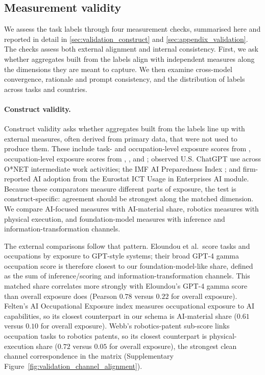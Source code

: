\documentclass[11pt]{article}
\begin{document}
\FloatBarrier
\subsection{Measurement validity}
\label{sec:data_external_benchmarks}
\label{sec:methods_validation}

We assess the task labels through four measurement checks, summarised here and reported in detail in \ref{sec:validation_construct} and \ref{sec:appendix_validation}. The checks assess both external alignment and internal consistency. First, we ask whether aggregates built from the labels align with independent measures along the dimensions they are meant to capture. We then examine cross-model convergence, rationale and prompt consistency, and the distribution of labels across tasks and countries.

\paragraph{Construct validity.} Construct validity asks whether aggregates built from the labels line up with external measures, often derived from primary data, that were not used to produce them. These include task- and occupation-level exposure scores from \citet{EloundouEtAl2024}, occupation-level exposure scores from \citet{frey2017future}, \citet{Webb2020}, and \citet{felten2021occupational}; observed U.S. ChatGPT use across O*NET intermediate work activities; the IMF AI Preparedness Index \citep{CazzanigaEtAl2024GenAI}; and firm-reported AI adoption from the Eurostat ICT Usage in Enterprises AI module. Because these comparators measure different parts of exposure, the test is construct-specific: agreement should be strongest along the matched dimension. We compare AI-focused measures with AI-material share, robotics measures with physical execution, and foundation-model measures with inference and information-transformation channels.

The external comparisons follow that pattern. Eloundou et al.\ score tasks and occupations by exposure to GPT-style systems; their broad GPT-4 gamma occupation score is therefore closest to our foundation-model-like share, defined as the sum of inference/scoring and information-transformation channels. This matched share correlates more strongly with Eloundou's GPT-4 gamma score than overall exposure does (Pearson $0.78$ versus $0.22$ for overall exposure). Felten's AI Occupational Exposure index measures occupational exposure to AI capabilities, so its closest counterpart in our schema is AI-material share ($0.61$ versus $0.10$ for overall exposure). Webb's robotics-patent sub-score links occupation tasks to robotics patents, so its closest counterpart is physical-execution share ($0.72$ versus $0.05$ for overall exposure), the strongest clean channel correspondence in the matrix (Supplementary Figure~\ref{fig:validation_channel_alignment}).
\end{document}

